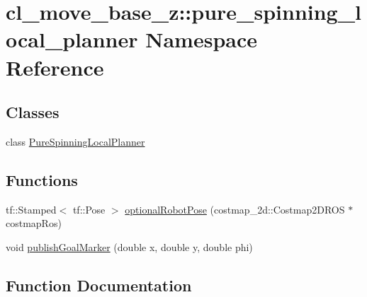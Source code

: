 \hypertarget{namespacecl__move__base__z_1_1pure__spinning__local__planner}{}\section{cl\+\_\+move\+\_\+base\+\_\+z\+:\+:pure\+\_\+spinning\+\_\+local\+\_\+planner Namespace Reference}
\label{namespacecl__move__base__z_1_1pure__spinning__local__planner}
\subsection*{Classes}
\begin{DoxyCompactItemize}
\item 
class \hyperlink{classcl__move__base__z_1_1pure__spinning__local__planner_1_1PureSpinningLocalPlanner}{Pure\+Spinning\+Local\+Planner}
\end{DoxyCompactItemize}
\subsection*{Functions}
\begin{DoxyCompactItemize}
\item 
tf\+::\+Stamped$<$ tf\+::\+Pose $>$ \hyperlink{namespacecl__move__base__z_1_1pure__spinning__local__planner_a6ae763fceb009e0c477171fefe74b4fc}{optional\+Robot\+Pose} (costmap\+\_\+2d\+::\+Costmap2\+D\+R\+OS $\ast$costmap\+Ros)
\item 
void \hyperlink{namespacecl__move__base__z_1_1pure__spinning__local__planner_ab6a498d3454059055f0aebf49c7b82cf}{publish\+Goal\+Marker} (double x, double y, double phi)
\end{DoxyCompactItemize}


\subsection{Function Documentation}
\mbox{\label{namespacecl__move__base__z_1_1pure__spinning__local__planner_a6ae763fceb009e0c477171fefe74b4fc}} 
